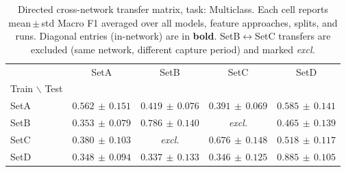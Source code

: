 \begin{table}
\caption{Directed cross-network transfer matrix, task: Multiclass. Each cell reports mean\,$\pm$\,std Macro F1 averaged over all models, feature approaches, splits, and runs. Diagonal entries (in-network) are in \textbf{bold}. SetB$\leftrightarrow$SetC transfers are excluded (same network, different capture period) and marked \textit{excl.}}
\label{tab:q3_matrix_multiclass}
\begin{tabular}{lcccc}
\toprule
 & SetA & SetB & SetC & SetD \\
Train $\backslash$ Test &  &  &  &  \\
\midrule
SetA & \textbf{$0.562\,{\pm}\,0.151$} & $0.419\,{\pm}\,0.076$ & $0.391\,{\pm}\,0.069$ & $0.585\,{\pm}\,0.141$ \\
SetB & $0.353\,{\pm}\,0.079$ & \textbf{$0.786\,{\pm}\,0.140$} & \textit{excl.} & $0.465\,{\pm}\,0.139$ \\
SetC & $0.380\,{\pm}\,0.103$ & \textit{excl.} & \textbf{$0.676\,{\pm}\,0.148$} & $0.518\,{\pm}\,0.117$ \\
SetD & $0.348\,{\pm}\,0.094$ & $0.337\,{\pm}\,0.133$ & $0.346\,{\pm}\,0.125$ & \textbf{$0.885\,{\pm}\,0.105$} \\
\bottomrule
\end{tabular}
\end{table}
